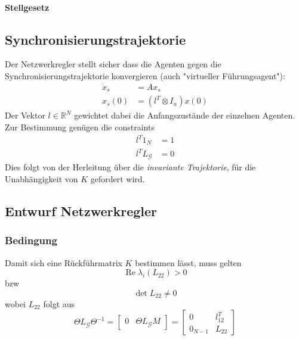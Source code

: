 \paragraph{Stellgesetz}


\subsection{Synchronisierungstrajektorie}
Der Netzwerkregler stellt sicher dass die Agenten gegen die Synchronisierungstrajektorie
konvergieren (auch "virtueller Führungsagent"):
\begin{align}
    \dot{x}_s &= Ax_s \\
    x_s(0) &= (l^T \otimes I_n) x(0)
\end{align}
Der Vektor $l \in \mathbb{R}^N$ gewichtet dabei die Anfangszustände der einzelnen
Agenten.
Zur Bestimmung genügen die constraints 
\begin{align}
    l^T 1_N &= 1 \\
    l^T L_\mathcal{G} &= 0
\end{align}
Dies folgt von der Herleitung über die \emph{invariante Trajektorie}, für die
Unabhängigkeit von $K$ gefordert wird.

\subsection{Entwurf Netzwerkregler}

\subsubsection{Bedingung}
Damit sich eine Rückführmatrix $K$ bestimmen lässt, muss gelten
\begin{equation}
    \operatorname{Re} \lambda_i(L_{22}) > 0
\end{equation}
bzw
\begin{equation}
    \det L_{22} \neq 0
\end{equation}
wobei $L_{22}$ folgt aus
\begin{equation}
    \Theta L_\mathcal{G} \Theta^{-1} = \begin{bmatrix}
        0 & \Theta L_\mathcal{G}M
    \end{bmatrix}
    = \begin{bmatrix}
        0 & l_{12}^T \\
        0_{N-1} & L_{22}
    \end{bmatrix}
\end{equation}

